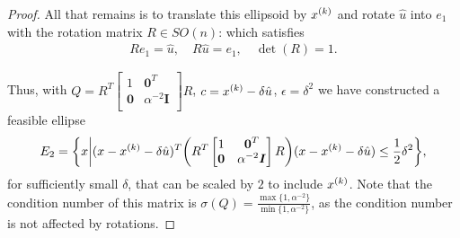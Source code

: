 \begin{proof}
All that remains is to translate this ellipsoid by ${x^{(k)}}$ and rotate $\hat u$ into $e_1$ with the rotation matrix $R \in SO(n)$:
which satisfies
\begin{align*}
Re_1 = \hat u, \quad
R\hat u = e_1, \quad
\det(R) = 1.
\end{align*}



Thus, with $Q = R^T\begin{bmatrix}
1 & \boldsymbol0^T \\
\boldsymbol 0 & \alpha^{-2} \boldsymbol I \\
\end{bmatrix}R$, $c = {x^{(k)}} - \delta \hat u$, $\epsilon = \delta^2$ we have constructed a feasible ellipse
\begin{align*}
E_2 = \bigg \{x \bigg | (x - {x^{(k)}} - \delta \hat u)^T\bigg(R^T\begin{bmatrix}
1 & \boldsymbol0^T \\
\boldsymbol 0 & \alpha^{-2} \boldsymbol I \\
\end{bmatrix}R\bigg)(x - {x^{(k)}} - \delta \hat u) \le \frac 1 2 \delta^2 \bigg\},
\end{align*}
for sufficiently small $\delta$, that can be scaled by $2$ to include ${x^{(k)}}$.
Note that the condition number of this matrix is $\sigma(Q) = \frac{\max\{1, \alpha^{-2}\}}{\min\{1, \alpha^{-2}\}}$,
as the condition number is not affected by rotations.





\end{proof}




